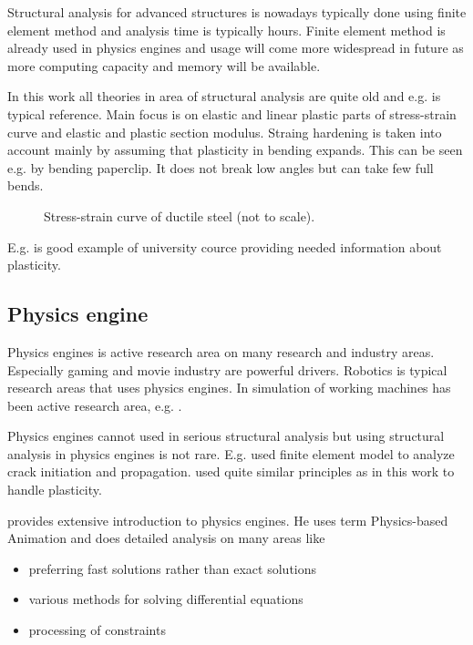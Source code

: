 Structural analysis for advanced structures is nowadays typically done using finite element method and 
analysis time is typically hours. Finite element method is already used in physics engines and usage will come 
more widespread in future as more computing capacity and memory will be available.

In this work all theories in area of structural analysis are quite old and e.g. 
\cite{timoshenko} is typical reference. Main focus is on elastic and 
linear plastic parts of stress-strain curve and elastic and plastic section modulus.
Straing hardening is taken into account mainly by assuming that plasticity in bending expands.
This can be seen e.g. by bending paperclip. It does not break low angles but can take few full bends.

\begin{figure}[htb!]
\centering
{}
\caption{Stress-strain curve of ductile steel (not to scale).}
\label{fig:areas}
\end{figure}

E.g. \cite{camp} is good example of university cource providing needed information about plasticity.

\subsection{Physics engine}

Physics engines is active research area on many research and industry areas.
Especially gaming and movie industry are powerful drivers.
Robotics is typical research areas that uses physics engines.
In \lut simulation of working machines has been active research area, e.g. \cite{moisio.thesis}.

Physics engines cannot used in serious structural analysis but using structural analysis in physics engines is not rare.  
E.g. \cite{Obrien:1999:GMA} used finite element model to analyze crack initiation and propagation.
\cite{cg1988} used quite similar principles as in this work to handle plasticity. 

\cite{erleben.thesis} provides extensive introduction to physics engines. 
He uses term Physics-based Animation and does detailed analysis on many areas like
\begin{itemize}
\item preferring fast solutions rather than exact solutions
\item various methods for solving differential equations
\item processing of constraints
\end{itemize}


